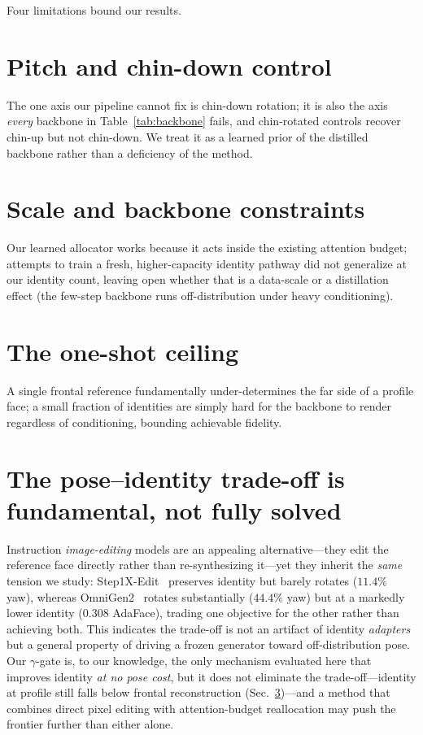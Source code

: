 \label{sec:limitations}
Four limitations bound our results.

\section{Pitch and chin-down control}
\label{sec:lim-pitch}
The one axis our pipeline cannot fix is chin-down rotation; it is also the axis
\emph{every} backbone in Table~\ref{tab:backbone} fails, and chin-rotated
controls recover chin-up but not chin-down. We treat it as a learned prior of
the distilled backbone rather than a deficiency of the method.

\section{Scale and backbone constraints}
\label{sec:lim-scale}
Our learned allocator works because it acts
inside the existing attention budget; attempts to train a fresh, higher-capacity
identity pathway did not generalize at our identity count, leaving open whether
that is a data-scale or a distillation effect (the few-step backbone runs
off-distribution under heavy conditioning).

\section{The one-shot ceiling}
\label{sec:lim-oneshot}
A single frontal reference fundamentally under-determines the far side of a profile
face; a small fraction of identities are simply hard for the backbone to render
regardless of conditioning, bounding achievable fidelity.

\section{The pose--identity trade-off is fundamental, not fully solved}
\label{sec:lim-tradeoff}
Instruction \emph{image-editing} models are an appealing alternative---they edit
the reference face directly rather than re-synthesizing it---yet they inherit the
\emph{same} tension we study: Step1X-Edit~\cite{step1xedit} preserves identity but
barely rotates ($11.4\%$ yaw), whereas OmniGen2~\cite{omnigen2} rotates
substantially ($44.4\%$ yaw) but at a markedly lower identity ($0.308$ AdaFace),
trading one objective for the other rather than achieving both. This indicates the
trade-off is not an artifact of identity \emph{adapters} but a general property of
driving a frozen generator toward off-distribution pose. Our $\gamma$-gate is, to
our knowledge, the only mechanism evaluated here that improves identity \emph{at no
pose cost}, but it does not eliminate the trade-off---identity at profile still
falls below frontal reconstruction (Sec.~\ref{sec:lim-oneshot})---and a method that
combines direct pixel editing with attention-budget reallocation may push the
frontier further than either alone.

